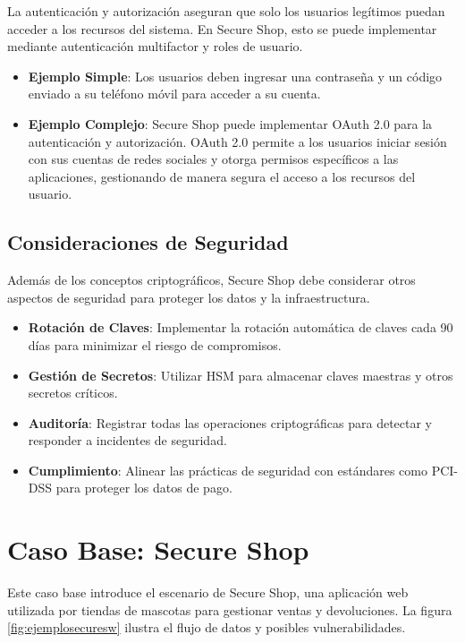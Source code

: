 La autenticación y autorización aseguran que solo los usuarios legítimos puedan acceder a los recursos del sistema. En Secure Shop, esto se puede implementar mediante autenticación multifactor y roles de usuario.

\begin{itemize}
    \item \textbf{Ejemplo Simple}: Los usuarios deben ingresar una contraseña y un código enviado a su teléfono móvil para acceder a su cuenta.
    \item \textbf{Ejemplo Complejo}: Secure Shop puede implementar OAuth 2.0 para la autenticación y autorización. OAuth 2.0 permite a los usuarios iniciar sesión con sus cuentas de redes sociales y otorga permisos específicos a las aplicaciones, gestionando de manera segura el acceso a los recursos del usuario.
\end{itemize}

\subsection{Consideraciones de Seguridad}

Además de los conceptos criptográficos, Secure Shop debe considerar otros aspectos de seguridad para proteger los datos y la infraestructura.

\begin{itemize}
    \item \textbf{Rotación de Claves}: Implementar la rotación automática de claves cada 90 días para minimizar el riesgo de compromisos.
    \item \textbf{Gestión de Secretos}: Utilizar HSM para almacenar claves maestras y otros secretos críticos.
    \item \textbf{Auditoría}: Registrar todas las operaciones criptográficas para detectar y responder a incidentes de seguridad.
    \item \textbf{Cumplimiento}: Alinear las prácticas de seguridad con estándares como PCI-DSS para proteger los datos de pago.
\end{itemize}

\section{Caso Base: Secure Shop}
Este caso base introduce el escenario de Secure Shop, una aplicación web utilizada por tiendas de mascotas para gestionar ventas y devoluciones. La figura \ref{fig:ejemplosecuresw} ilustra el flujo de datos y posibles vulnerabilidades.

